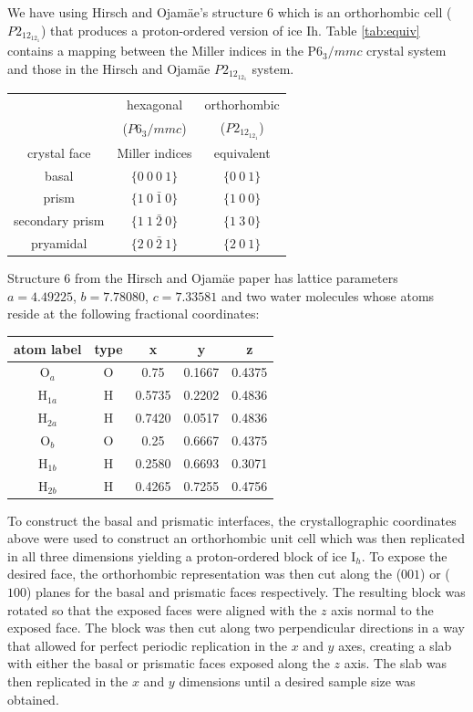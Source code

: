 \documentclass[journal = jpccck, manuscript = article]{achemso}
\begin{document}
We have using Hirsch and Ojam\"{a}e's structure 6 which is an
orthorhombic cell ($P2_12_12_1$) that produces a proton-ordered
version of ice Ih.  Table \ref{tab:equiv} contains a mapping between
the Miller indices in the P$6_3/mmc$ crystal system and those in the
Hirsch and Ojam\"{a}e $P2_12_12_1$ system.

\begin{table}
\begin{tabular}{|ccc|} \hline
 & hexagonal & orthorhombic \\
 & ($P6_3/mmc$) & ($P2_12_12_1$) \\
 crystal face  & Miller indices & equivalent \\ \hline
basal & $\{0~0~0~1\}$ & $\{0~0~1\}$ \\
prism & $\{1~0~\bar{1}~0\}$ & $\{1~0~0\}$ \\
secondary prism & $\{1~1~\bar{2}~0\}$ & $\{1~3~0\}$ \\
pryamidal & $\{2~0~\bar{2}~1\}$ & $\{2~0~1\}$ \\ \hline
\end{tabular}
\end{table}

Structure 6 from the Hirsch and Ojam\"{a}e paper has lattice
parameters $a = 4.49225$, $b = 7.78080$, $c = 7.33581$ and two water
molecules whose atoms reside at the following fractional coordinates:

\begin{table}
\begin{tabular}{|ccccc|}  \hline
atom label & type & x & y & z \\ \hline
O$_{a}$    & O & 0.75 & 0.1667 & 0.4375 \\
H$_{1a}$ & H & 0.5735 & 0.2202 & 0.4836 \\
H$_{2a}$ & H & 0.7420 & 0.0517 & 0.4836 \\
O$_{b}$    & O & 0.25 & 0.6667 & 0.4375 \\
H$_{1b}$ & H & 0.2580 & 0.6693 & 0.3071 \\
H$_{2b}$ & H & 0.4265 & 0.7255 & 0.4756 \\ \hline
\end{tabular}
\end{table}

To construct the basal and prismatic interfaces, the crystallographic
coordinates above were used to construct an orthorhombic unit cell
which was then replicated in all three dimensions yielding a
proton-ordered block of ice I$_{h}$. To expose the desired face, the
orthorhombic representation was then cut along the ($001$) or ($100$)
planes for the basal and prismatic faces respectively.  The resulting
block was rotated so that the exposed faces were aligned with the $z$
axis normal to the exposed face.  The block was then cut along two
perpendicular directions in a way that allowed for perfect periodic
replication in the $x$ and $y$ axes, creating a slab with either the
basal or prismatic faces exposed along the $z$ axis.  The slab was
then replicated in the $x$ and $y$ dimensions until a desired sample
size was obtained.  
\end{document}
